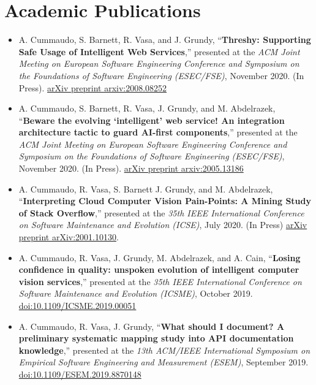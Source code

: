 \section{Academic Publications}

\medskip
{
\footnotesize
\begin{itemize}
  \itemsep-1.5em
  \item A. Cummaudo, S. Barnett, R. Vasa, and J. Grundy, ``\textbf{Threshy: Supporting Safe Usage of Intelligent Web Services},'' presented at the \textit{ACM Joint Meeting on European Software Engineering Conference and Symposium on the Foundations of Software Engineering (ESEC/FSE)}, November 2020. (In Press). \href{https://arxiv.org/abs/2008.08252}{arXiv preprint arxiv:2008.08252}\\
  \item A. Cummaudo, S. Barnett, R. Vasa, J. Grundy, and M. Abdelrazek, ``\textbf{Beware the evolving `intelligent' web service! An integration architecture tactic to guard AI-first components},'' presented at the \textit{ACM Joint Meeting on European Software Engineering Conference and Symposium on the Foundations of Software Engineering (ESEC/FSE)}, November 2020. (In Press). \href{https://arxiv.org/abs/2005.13186}{arXiv preprint arxiv:2005.13186}\\
  \item A. Cummaudo, R. Vasa, S. Barnett J. Grundy, and M. Abdelrazek, ``\textbf{Interpreting Cloud Computer Vision Pain-Points: A Mining Study of Stack Overflow},'' presented at the \textit{35th IEEE International Conference on Software Maintenance and Evolution (ICSE)}, July 2020. (In Press) \href{https://arxiv.org/abs/2001.10130}{arXiv preprint arXiv:2001.10130}.\\
  \item A. Cummaudo, R. Vasa, J. Grundy, M. Abdelrazek, and A. Cain, ``\textbf{Losing confidence in quality: unspoken evolution of intelligent computer vision services},'' presented at the \textit{35th IEEE International Conference on Software Maintenance and Evolution (ICSME)}, October 2019. \href{https://doi.org/10.1109/ICSME.2019.00051}{doi:10.1109/ICSME.2019.00051}\\
  \item A. Cummaudo, R. Vasa, J. Grundy, ``\textbf{What should I document? A preliminary systematic mapping study into API documentation knowledge},'' presented at the \textit{13th ACM/IEEE International Symposium on Empirical Software Engineering and Measurement (ESEM)}, September 2019. \href{https://doi.org/10.1109/ESEM.2019.8870148}{doi:10.1109/ESEM.2019.8870148}\\

\end{itemize}}

